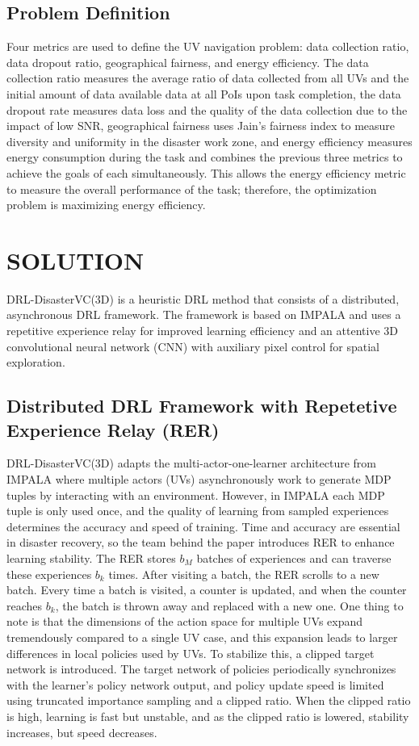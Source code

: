 \documentclass[sigconf, natbib=false]{acmart}
\begin{document}
   \subsection{Problem Definition}
   Four metrics are used to define the UV navigation problem: data collection ratio, data dropout ratio, geographical fairness, and energy efficiency. The data collection ratio measures the average ratio of data collected from all UVs and the initial amount of data available data at all PoIs upon task completion, the data dropout rate measures data loss and the quality of the data collection due to the impact of low SNR, geographical fairness uses Jain's fairness index to measure diversity and uniformity in the disaster work zone, and energy efficiency measures energy consumption during the task and combines the previous three metrics to achieve the goals of each simultaneously. This allows the energy efficiency metric to measure the overall performance of the task; therefore, the optimization problem is maximizing energy efficiency.

   \section{SOLUTION}
   DRL-DisasterVC(3D) is a heuristic DRL method that consists of a distributed, asynchronous DRL framework. The framework is based on IMPALA and uses a repetitive experience relay for improved learning efficiency and an attentive 3D convolutional neural network (CNN) with auxiliary pixel control for spatial exploration.

   \subsection{Distributed DRL Framework with Repetetive Experience Relay (RER)}
   DRL-DisasterVC(3D) adapts the multi-actor-one-learner architecture from IMPALA where multiple actors (UVs) asynchronously work to generate MDP tuples by interacting with an environment. However, in IMPALA each MDP tuple is only used once, and the quality of learning from sampled experiences determines the accuracy and speed of training. Time and accuracy are essential in disaster recovery, so the team behind the paper introduces RER to enhance learning stability. The RER stores $b_M$ batches of experiences and can traverse these experiences $b_k$ times. After visiting a batch, the RER scrolls to a new batch. Every time a batch is visited, a counter is updated, and when the counter reaches $b_k$, the batch is thrown away and replaced with a new one. One thing to note is that the dimensions of the action space for multiple UVs expand tremendously compared to a single UV case, and this expansion leads to larger differences in local policies used by UVs. To stabilize this, a clipped target network is introduced. The target network of policies periodically synchronizes with the learner's policy network output, and policy update speed is limited using truncated importance sampling and a clipped ratio. When the clipped ratio is high, learning is fast but unstable, and as the clipped ratio is lowered, stability increases, but speed decreases. 
   
\end{document}
